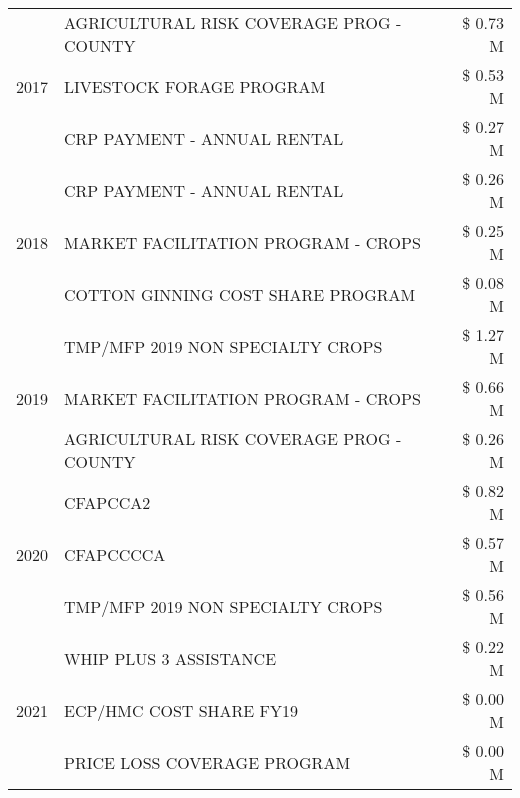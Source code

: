 \begin{tabular}{llr}
\cline{1-3}
\multirow[t]{3}{*}{2017} & AGRICULTURAL RISK COVERAGE PROG - COUNTY & \$ 0.73 M \\
 & LIVESTOCK FORAGE PROGRAM & \$ 0.53 M \\
 & CRP PAYMENT - ANNUAL RENTAL & \$ 0.27 M \\
\cline{1-3}
\multirow[t]{3}{*}{2018} & CRP PAYMENT - ANNUAL RENTAL & \$ 0.26 M \\
 & MARKET FACILITATION PROGRAM - CROPS & \$ 0.25 M \\
 & COTTON GINNING COST SHARE PROGRAM & \$ 0.08 M \\
\cline{1-3}
\multirow[t]{3}{*}{2019} & TMP/MFP 2019 NON SPECIALTY CROPS & \$ 1.27 M \\
 & MARKET FACILITATION PROGRAM - CROPS & \$ 0.66 M \\
 & AGRICULTURAL RISK COVERAGE PROG - COUNTY & \$ 0.26 M \\
\cline{1-3}
\multirow[t]{3}{*}{2020} & CFAPCCA2 & \$ 0.82 M \\
 & CFAPCCCCA & \$ 0.57 M \\
 & TMP/MFP 2019 NON SPECIALTY CROPS & \$ 0.56 M \\
\cline{1-3}
\multirow[t]{3}{*}{2021} & WHIP PLUS 3 ASSISTANCE & \$ 0.22 M \\
 & ECP/HMC COST SHARE FY19 & \$ 0.00 M \\
 & PRICE LOSS COVERAGE PROGRAM & \$ 0.00 M \\
\cline{1-3}
\bottomrule
\end{tabular}
